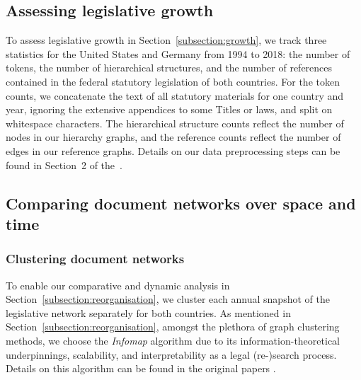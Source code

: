 \subsection{Assessing legislative growth}\label{subsection:methods:growth}

To assess legislative growth in Section~\ref{subsection:growth}, 
we track three statistics for the United States and Germany from 1994 to 2018: 
the number of tokens, 
the number of hierarchical structures, 
and the number of references contained in the federal statutory legislation of both countries. 
For the token counts, we concatenate the text of all statutory materials for one country and year, 
ignoring the extensive appendices to some Titles or laws,
and split on whitespace characters. 
The hierarchical structure counts reflect the number of nodes in our hierarchy graphs, 
and the reference counts reflect the number of edges in our reference graphs.
Details on our data preprocessing steps can be found in Section~2 of the~\suppi. 

\subsection{Comparing document networks over space and time}

\subsubsection{Clustering document networks}\label{subsubsection:methods:clustering}

To enable our comparative and dynamic analysis in Section~\ref{subsection:reorganisation}, 
we cluster each annual snapshot of the legislative network separately for both countries. 
As mentioned in Section~\ref{subsection:reorganisation},
amongst the plethora of graph clustering methods, 
we choose the \emph{Infomap} algorithm due to its information-theoretical underpinnings, scalability, and interpretability as a legal (re-)search process. 
Details on this algorithm can be found in the original papers \cite{rosvall2008,rosvall2009}.

